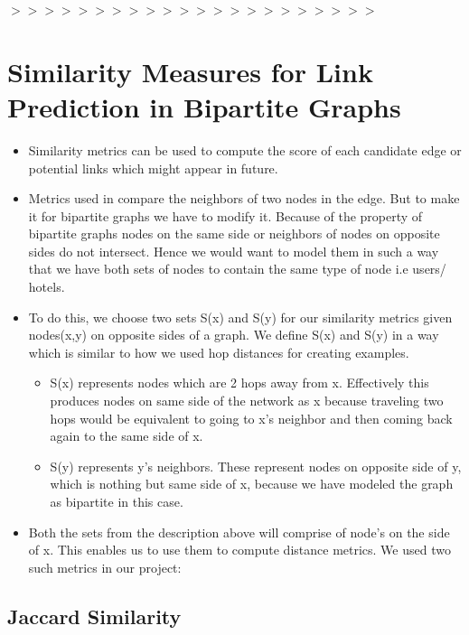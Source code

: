 \documentclass[letterpaper,twocolumn,11pt]{article}
\begin{document}
$>>>>>>>>>>>>>>>>>>>>>>$


\section{Similarity Measures for Link Prediction in Bipartite Graphs}

\begin{itemize}

\item Similarity metrics can be used to compute the score of each candidate edge or potential links which might appear in future.

\item Metrics used in \cite{four} compare the neighbors of two nodes in the edge. But to make it for bipartite graphs we have to modify it. Because of the property of bipartite graphs nodes on the same side or neighbors of nodes on opposite sides do not intersect. Hence we would want to model them in such a way that we have both sets of nodes to contain the same type of node i.e users/ hotels.

\item To do this, we choose two sets S(x) and S(y) for our similarity metrics given nodes(x,y) on opposite sides of a graph. We define S(x) and S(y) in a way which is similar to how we used hop distances for creating examples.

\begin{itemize}
\item S(x) represents nodes which are 2 hops away from x. Effectively this produces nodes on same side of the network as x because traveling two hops would be equivalent to going to x's neighbor and then coming back again to the same side of x. 

\item S(y) represents y's neighbors. These represent nodes on opposite side of y, which is nothing but same side of x, because we have modeled the graph as bipartite in this case.
\end{itemize}

\item Both the sets from the description above will comprise of node's on the side of x.  This enables us to use them to compute distance metrics. We used two such metrics in our project:

\end{itemize}

\subsection{Jaccard Similarity}
\end{document}
